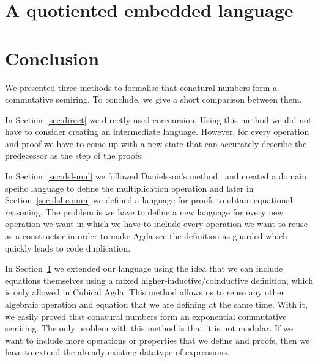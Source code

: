\documentclass[sigplan, screen, natbib=false, review]{acmart}
\begin{document}

\section{A quotiented embedded language}\label{sec:quotiented}



\section{Conclusion}


We presented three methods to formalise that conatural numbers form a
commutative semiring. To conclude, we give a short comparison between them.


In Section~\ref{sec:direct} we directly used corecursion. Using this method we
did not have to consider creating an intermediate language. However, for every
operation and proof we have to come up with a new state that can accurately
describe the predecessor as the step of the proofs.

In Section~\ref{sec:dsl-mul} we followed Danielsson's
method~\cite{danielsson-beating} and created a domain speific language to define
the multiplication operation and later in Section~\ref{sec:dsl-comm} we defined
a language for proofs to obtain equational reasoning. The problem is we have to
define a new language for every new operation we want in which we have to
include every operation we want to reuse as a constructor in order to make Agda
see the definition as guarded which quickly leads to code duplication.

In Section~\ref{sec:quotiented} we extended our language using the idea that we
can include equations themselves using a mixed higher-inductive/coinductive
definition, which is only allowed in Cubical Agda. This method allows us to
reuse any other algebraic operation and equation that we are defining at the
same time. With it, we easily proved that conatural numbers form an exponential
commutative semiring. The only problem with this method is that it is not
modular. If we want to include more operations or properties that we define and
proofs, then we have to extend the already existing datatype of expressions.
\end{document}

